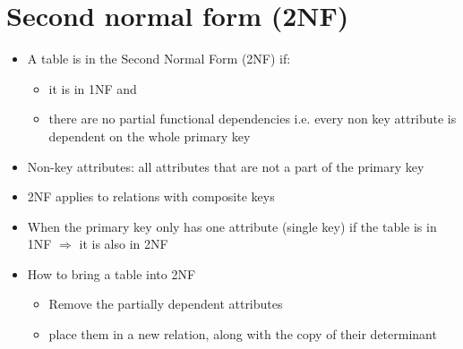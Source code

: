 \documentclass{article}[18pt]
\begin{document}
\section{Second normal form (2NF)}
\begin{itemize}
	\item A table is in the Second Normal Form (2NF) if:
	\begin{itemize}
		\item it is in 1NF and
		\item there are no partial functional dependencies i.e. every non key attribute is dependent on the whole primary key
	\end{itemize}
	\item Non-key attributes: all attributes that are not a part of the primary key
	\item 2NF applies to relations with composite keys
	\item When the primary key only has one attribute (single key) if the table is in 1NF $\Rightarrow$ it is also in 2NF
	\item How to bring a table into 2NF
	\begin{itemize}
		\item Remove the partially dependent attributes
		\item place them in a new relation, along with the copy of their determinant
	\end{itemize}
\end{itemize}
\end{document}
